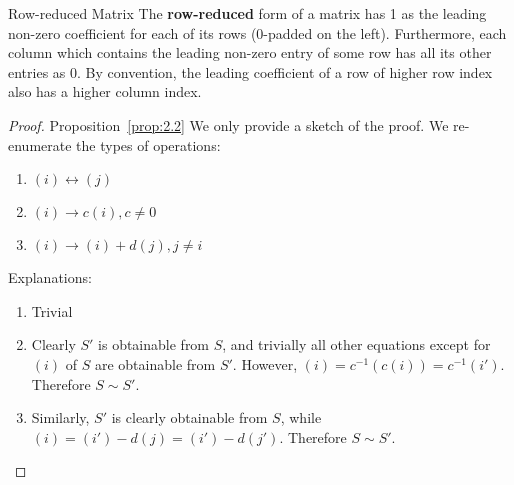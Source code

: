 \begin{definition} {Row-reduced Matrix}
    The \textbf{row-reduced} form of a matrix has 1 as the leading non-zero coefficient for each of its rows (0-padded on the left). Furthermore, each column which contains the leading non-zero entry of some row has all its other entries as 0. By convention, the leading coefficient of a row of higher row index also has a higher column index.
\end{definition}

\begin{proof}{Proposition~\ref{prop:2.2}}
    We only provide a sketch of the proof. We re-enumerate the types of operations:
    \begin{enumerate}
        \item \((i) \leftrightarrow (j)\)
        \item \((i) \rightarrow c(i), c \neq 0\)
        \item \((i) \rightarrow (i) + d(j), j \neq i\)
    \end{enumerate}
    Explanations:
    \begin{enumerate}
        \item Trivial
        \item Clearly \(S'\) is obtainable from \(S\), and trivially all other equations except for \((i)\) of \(S\) are obtainable from \(S'\). However, \((i) = c^{-1}(c(i)) = c^{-1}(i')\). Therefore \(S \sim S'\).
        \item Similarly, \(S'\) is clearly obtainable from \(S\), while \((i) = (i') - d(j) = (i') - d(j')\). Therefore \(S \sim S'\).
    \end{enumerate}
\end{proof}

